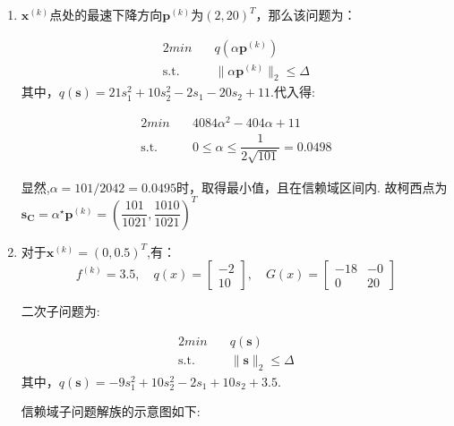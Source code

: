 \documentclass[UTF8]{ctexart}
\begin{document}
\begin{enumerate}
\begin{enumerate}
\item
$\bm{x}^{(k)}$点处的最速下降方向$\bm{p}^{(k)}$为$(2,20)^T$，那么该问题为：

\begin{alignat}{2}
min \quad & q(\alpha \bm{p}^{(k)}) \nonumber\\
\mbox{s.t.}\quad
&\|\alpha \bm{p}^{(k)}\|_2\leq\Delta \nonumber
\end{alignat}
其中，$q(\bm{s})=21s_1^2+10s_2^2-2s_1-20s_2+11$.代入得:

\begin{alignat}{2}
min \quad & 4084\alpha^2-404\alpha+11 \nonumber\\
\mbox{s.t.}\quad
&0\leq \alpha\leq \dfrac{1}{2\sqrt{101}}=0.0498 \nonumber
\end{alignat}

显然,$\alpha=101/2042=0.0495$时，取得最小值，且在信赖域区间内.
故柯西点为$\bm{s_C}=\alpha^{\star} \bm{p}^{(k)}=(\dfrac{101}{1021},\dfrac{1010}{1021})^T$

\item
对于$\bm{x}^{(k)}=(0,0.5)^T$,有：
\[f^{(k)}=3.5,\quad 
q(x)=\begin{bmatrix}
-2\\
10
\end{bmatrix},\quad 
G(x)=\begin{bmatrix}
-18&-0\\
0&20
\end{bmatrix}\]

二次子问题为:

\begin{alignat}{2}
min \quad & q(\bm{s}) \nonumber\\
\mbox{s.t.}\quad
&\|\bm{s}\|_2\leq\Delta \nonumber
\end{alignat}
其中，$q(\bm{s})=-9s_1^2+10s_2^2-2s_1+10s_2+3.5$.

信赖域子问题解族的示意图如下:


\end{enumerate}
\end{enumerate}
\end{document}

